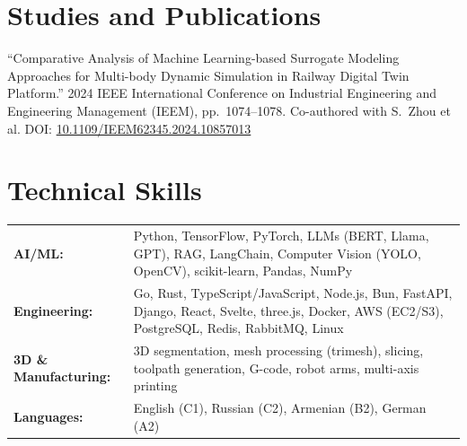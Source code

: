 \documentclass{ExpressiveResume}
\begin{document}
\section{Studies and Publications}
{
\noindent ``Comparative Analysis of Machine Learning-based Surrogate Modeling Approaches for Multi-body Dynamic Simulation in Railway Digital Twin Platform.'' 2024 IEEE International Conference on Industrial Engineering and Engineering Management (IEEM), pp.~1074--1078. Co-authored with S.~Zhou et al. DOI: \href{https://doi.org/10.1109/IEEM62345.2024.10857013}{10.1109/IEEM62345.2024.10857013}
}





\section{Technical Skills}
\noindent\begin{tabularx}{\textwidth}{@{}>{\bfseries}l X@{}}
AI/ML:        & Python, TensorFlow, PyTorch, LLMs (BERT, Llama, GPT), RAG, LangChain, Computer Vision (YOLO, OpenCV), scikit-learn, Pandas, NumPy \\
Engineering:  & Go, Rust, TypeScript/JavaScript, Node.js, Bun, FastAPI, Django, React, Svelte, three.js, Docker, AWS (EC2/S3), PostgreSQL, Redis, RabbitMQ, Linux \\
3D \& Manufacturing: & 3D segmentation, mesh processing (trimesh), slicing, toolpath generation, G-code, robot arms, multi-axis printing \\
Languages:    & English (C1), Russian (C2), Armenian (B2), German (A2) \\
\end{tabularx}
\end{document}
